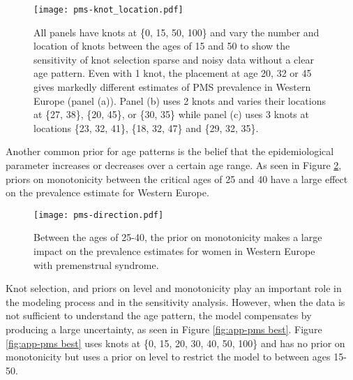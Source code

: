     \begin{figure}
        \begin{center}
            \texttt{[image: pms-knot\_location.pdf]}
        \end{center}
        \caption{All panels have knots at \{0, 15, 50, 100\} and vary
          the number and location of knots between the ages of 15 and
          50 to show the sensitivity of knot selection sparse and
          noisy data without a clear age pattern. Even with 1 knot,
          the placement at age 20, 32 or 45 gives markedly different
          estimates of PMS prevalence in Western Europe (panel (a)).
          Panel (b) uses 2 knots and varies their locations at \{27,
          38\}, \{20, 45\}, or \{30, 35\} while panel (c) uses 3 knots
          at locations \{23, 32, 41\}, \{18, 32, 47\} and \{29, 32,
          35\}.}
        \label{fig:app-pms knot_loc}
    \end{figure}

Another common prior for age patterns is the belief that the
epidemiological parameter increases or decreases over a certain age
range.  As seen in Figure \ref{fig:app-pms dir}, priors on
monotonicity between the critical ages of 25 and 40 have a large
effect on the prevalence estimate for Western Europe.

    \begin{figure}
        \begin{center}
            \texttt{[image: pms-direction.pdf]}
        \end{center}
        \caption{Between the ages of 25-40, the prior on monotonicity
          makes a large impact on the prevalence estimates for women
          in Western Europe with premenstrual syndrome.}
        \label{fig:app-pms dir}
    \end{figure}

Knot selection, and priors on level and monotonicity play an important
role in the modeling process and in the sensitivity analysis.  However,
when the data is not sufficient to understand the age pattern, the
model compensates by producing a large uncertainty, as seen in
Figure \ref{fig:app-pms best}.  Figure \ref{fig:app-pms best} uses knots
at \{0, 15, 20, 30, 40, 50, 100\} and has no prior on monotonicity but
uses a prior on level to restrict the model to between ages 15-50.  

